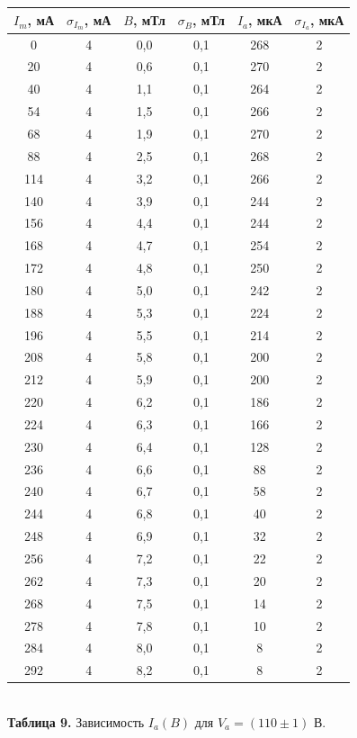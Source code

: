 \documentclass{article}
\begin{document}
\begin{center}
\begin{tabular}{|c|c|c|c|c|c|}
\hline
$I_m$, мА & $\sigma_{I_m}$, мА & $B$, мТл & $\sigma_B$, мТл & $I_a$, мкА & $\sigma_{I_a}$, мкА \\ \hline
0 & 4 & 0,0 & 0,1 & 268 & 2 \\ \hline
20 & 4 & 0,6 & 0,1 & 270 & 2 \\ \hline
40 & 4 & 1,1 & 0,1 & 264 & 2 \\ \hline
54 & 4 & 1,5 & 0,1 & 266 & 2 \\ \hline
68 & 4 & 1,9 & 0,1 & 270 & 2 \\ \hline
88 & 4 & 2,5 & 0,1 & 268 & 2 \\ \hline
114 & 4 & 3,2 & 0,1 & 266 & 2 \\ \hline
140 & 4 & 3,9 & 0,1 & 244 & 2 \\ \hline
156 & 4 & 4,4 & 0,1 & 244 & 2 \\ \hline
168 & 4 & 4,7 & 0,1 & 254 & 2 \\ \hline
172 & 4 & 4,8 & 0,1 & 250 & 2 \\ \hline
180 & 4 & 5,0 & 0,1 & 242 & 2 \\ \hline
188 & 4 & 5,3 & 0,1 & 224 & 2 \\ \hline
196 & 4 & 5,5 & 0,1 & 214 & 2 \\ \hline
208 & 4 & 5,8 & 0,1 & 200 & 2 \\ \hline
212 & 4 & 5,9 & 0,1 & 200 & 2 \\ \hline
220 & 4 & 6,2 & 0,1 & 186 & 2 \\ \hline
224 & 4 & 6,3 & 0,1 & 166 & 2 \\ \hline
230 & 4 & 6,4 & 0,1 & 128 & 2 \\ \hline
236 & 4 & 6,6 & 0,1 & 88 & 2 \\ \hline
240 & 4 & 6,7 & 0,1 & 58 & 2 \\ \hline
244 & 4 & 6,8 & 0,1 & 40 & 2 \\ \hline
248 & 4 & 6,9 & 0,1 & 32 & 2 \\ \hline
256 & 4 & 7,2 & 0,1 & 22 & 2 \\ \hline
262 & 4 & 7,3 & 0,1 & 20 & 2 \\ \hline
268 & 4 & 7,5 & 0,1 & 14 & 2 \\ \hline
278 & 4 & 7,8 & 0,1 & 10 & 2 \\ \hline
284 & 4 & 8,0 & 0,1 & 8 & 2 \\ \hline
292 & 4 & 8,2 & 0,1 & 8 & 2 \\ \hline
\end{tabular}\\
\textbf{Таблица 9.} Зависимость $I_a(B)$ для $V_a = (110 \pm 1)$ В.
\end{center}
\end{document}
